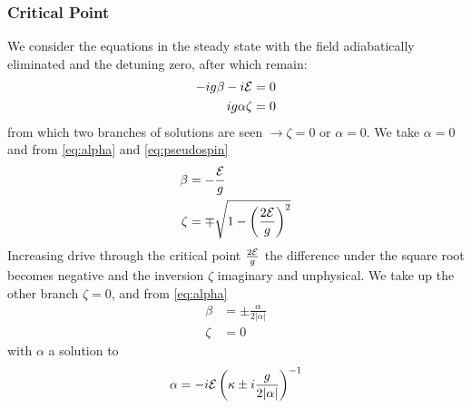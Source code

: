 \subsubsection{Critical Point}
We consider the equations in the steady state with the field adiabatically eliminated and the detuning zero, after which remain:
\begin{align}
	-ig \beta -i \mathcal{E} &= 0 \\
	ig\alpha \zeta &= 0 
\end{align}
from which two branches of solutions are seen $\rightarrow \zeta = 0$ or $\alpha = 0$. We take $\alpha = 0$ and from \cref{eq:alpha} and \cref{eq:pseudospin} 
\begin{align}
	\beta &= -\frac{\mathcal{E}}{g} \\
	\zeta &= \mp \sqrt{1 - \left( \frac{2\mathcal{E}}{g} \right)^2} 
\end{align}
Increasing drive through the critical point $\frac{2\mathcal{E}}{g}$ the difference under the square root becomes negative and the inversion $\zeta$ imaginary and unphysical. We take up the other branch $\zeta = 0$, and from \cref{eq:alpha}
\begin{align}
	\beta &= \pm \frac{\alpha}{2|\alpha|} \\
	\zeta &= 0 
\end{align}
with $\alpha$ a solution to 
\begin{equation}
	\alpha = -i \mathcal{E}\left ( \kappa \pm i \frac{g}{2|\alpha|} \right )^{-1}
\end{equation}
